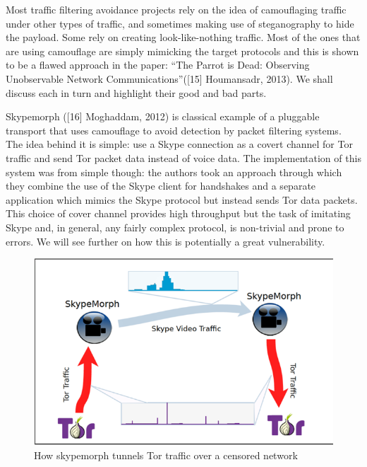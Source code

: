 \documentclass[11pt]{book} %
\begin{document}

Most traffic filtering avoidance projects rely on the idea of camouflaging traffic under other types of traffic, and sometimes making use of steganography to hide the payload. Some rely on creating look-like-nothing traffic. Most of the ones that are using camouflage are simply mimicking the target protocols and this is shown to be a flawed approach in the paper: “The Parrot is Dead: Observing Unobservable Network Communications”([15] Houmansadr, 2013). We shall discuss each in turn and highlight their good and bad parts.

Skypemorph ([16] Moghaddam, 2012) is classical example of a pluggable transport that uses camouflage to avoid detection by packet filtering systems. The idea behind it is simple: use a Skype connection as a covert channel for Tor traffic and send Tor packet data instead of voice data. The implementation of this system was from simple though: the authors took an approach through which they combine the use of the Skype client for handshakes and a separate application which mimics the Skype protocol but instead sends Tor data packets. This choice of cover channel provides high throughput but the task of imitating Skype and, in general, any fairly complex protocol, is non-trivial and prone to errors. We will see further on how this is potentially a great vulnerability.

\begin{figure}[h!]
\begin{center}
\includegraphics[scale=0.5]{skypemorph}
\end{center}
 \caption{How skypemorph tunnels Tor traffic over a censored network}
 \label{fig:skymorph}
 \end{figure}
\end{document}
